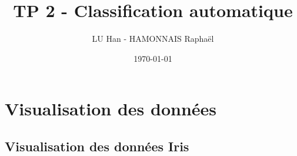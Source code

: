 \documentclass[a4paper,10pt]{report}
\title{TP 2 - Classification automatique}
\author{LU Han - HAMONNAIS Raphaël}
\date{\today}
\begin{document}
\renewcommand{\labelitemi}{\large\textcolor{tatoebagreen}{\fg}}
\groovypdtitre
\restoregeometry %


\tableofcontents




\chapter{Visualisation des données}

\section{Visualisation des données Iris}
\end{document}
